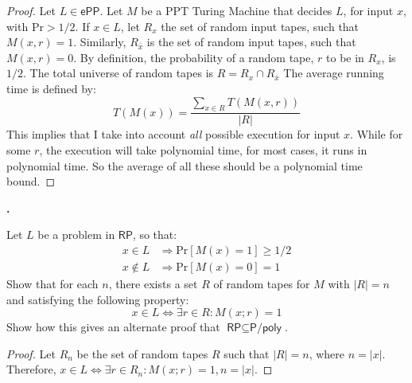 \documentclass[letterpaper,11pt]{article}
\newcommand{\cc}[1]{\ensuremath{\textsf{#1}}\xspace}
\newcommand{\Ppoly}{\cc{P/poly}}
\newcommand{\RP}{\cc{RP}}
\newcommand{\ePP}{\cc{ePP}}
\newcommand{\Prob}{\mbox{Pr}}
\newcounter{problem}
\newenvironment{problem}%
{%
	\stepcounter{problem}%
	\textbf{\theproblem.}
	\large
}{\\}%
\newcommand{\tm}{Turing Machine}
\begin{document}
\begin{proof}

Let $L \in \ePP$.
Let $M$ be a PPT \tm{} that decides $L$, for input $x$, with $\Prob > 1/2$.
If $x \in L$, let $R_x$ the set of random input tapes, such that $M(x,r)=1$.
Similarly, $R_{\bar{x}}$ is the set of random input tapes, such that $M(x,r)=0$.
By definition, the probability of a random tape, $r$ to be in $R_x$, is $1/2$.
The total universe of random tapes is $R = R_x \cap R_{\bar{x}}$
The average running time is defined by:
\[
	T(M(x)) = \frac{\sum\limits_{x \in R} T(M(x,r))}{|R|}
\]
This implies that I take into account {\it all} possible execution for input $x$.
While for some $r$, the execution will take polynomial time, for most cases, it runs in polynomial time.
So the average of all these should be a polynomial time bound.
\end{proof}


\begin{problem}
Let $L$ be a problem in $\RP$, so that:
\begin{align*}
	x \in L &\Rightarrow \Prob[M(x) = 1] \geq 1/2 \\
	x \not \in L &\Rightarrow \Prob[M(x) = 0] = 1
\end{align*}
Show that for each $n$, there exists a set $R$ of random tapes for $M$ with $|R| = n$ and satisfying the following property:
\[
	x \in L \Leftrightarrow \exists r \in R : M(x;r) = 1
\]
Show how this gives an alternate proof that $\RP \subseteq \Ppoly$.
\end{problem}

\begin{proof}
Let $R_n$ be the set of random tapes $R$ such that $|R| = n$, where $n = |x|$.
Therefore, $x \in L \Leftrightarrow \exists r \in R_n : M(x;r) = 1, n = |x|$.
\end{proof}
\end{document}
